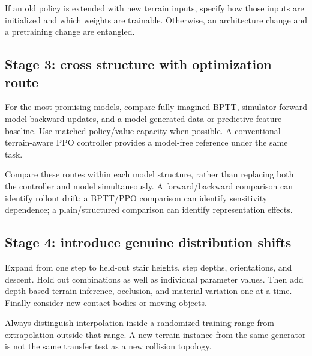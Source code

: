 If an old policy is extended with new terrain inputs, specify how those inputs
are initialized and which weights are trainable. Otherwise, an architecture
change and a pretraining change are entangled.

\subsection{Stage 3: cross structure with optimization route}
For the most promising models, compare fully imagined BPTT, simulator-forward
model-backward updates, and a model-generated-data or predictive-feature baseline.
Use matched policy/value capacity when possible. A conventional terrain-aware
PPO controller provides a model-free reference under the same task.

Compare these routes within each model structure, rather than replacing both
the controller and model simultaneously. A forward/backward comparison can
identify rollout drift; a BPTT/PPO comparison can identify sensitivity dependence;
a plain/structured comparison can identify representation effects.

\subsection{Stage 4: introduce genuine distribution shifts}
Expand from one step to held-out stair heights, step depths, orientations, and
descent. Hold out combinations as well as individual parameter values. Then add
depth-based terrain inference, occlusion, and material variation one at a time.
Finally consider new contact bodies or moving objects.

Always distinguish interpolation inside a randomized training range from
extrapolation outside that range. A new terrain instance from the same generator
is not the same transfer test as a new collision topology.

